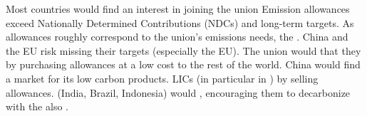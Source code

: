 \documentclass[aspectratio=169,xcolor=dvipsnames, 11pt,mathserif]{beamer}
\begin{document}

\begin{frame}{Most countries would find an interest in joining the union}
    \bbsp \ip Emission allowances exceed Nationally Determined Contributions (NDCs) and long-term targets.
    \ip As allowances roughly correspond to the union's emissions needs, the .
    \ip China and the EU risk missing their targets (especially the EU). The union would  that they  by purchasing allowances at a low cost to the rest of the world.
    \ip China would find a market for its low carbon products. 
    \ip LICs (in particular in )  by selling allowances. %
    \ip {} (India, Brazil, Indonesia) would , encouraging them to decarbonize with the  also .
    \ee
\end{frame}
\end{document}
